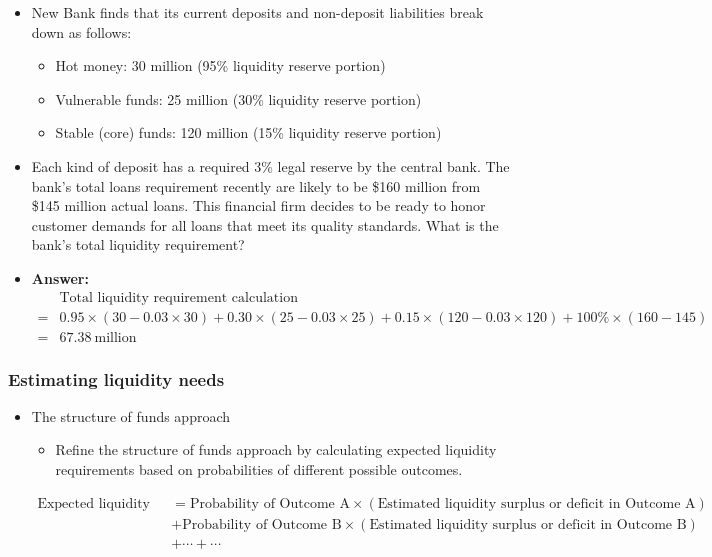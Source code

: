 \begin{itemize}
  \item New Bank finds that its current deposits and non-deposit liabilities break down as follows:
  \begin{itemize}
    \item Hot money: 30 million (95\% liquidity reserve portion)
    \item Vulnerable funds: 25 million (30\% liquidity reserve portion)
    \item Stable (core) funds: 120 million (15\% liquidity reserve portion)
  \end{itemize}
  \item Each kind of deposit has a required 3\% legal reserve by the central bank. The bank's total loans requirement recently are likely to be \$160 million from \$145 million actual loans. This financial firm decides to be ready to honor customer demands for all loans that meet its quality standards. What is the bank's total liquidity requirement?
  \item \textbf{Answer:}
    \[
    \begin{aligned}
        &\text{Total liquidity requirement calculation} \\
        =&
      0.95 \times (30 - 0.03 \times 30)  + 0.30 \times (25 - 0.03 \times 25) + 0.15 \times (120 - 0.03 \times 120) + 100\% \times (160 - 145) \\
      =& 67.38\ \text{million}
    \end{aligned}
    \]

\end{itemize}







\subsubsection{Estimating liquidity needs}
\begin{itemize}

\item The structure of funds approach
    \begin{itemize}

    \item Refine the structure of funds approach by calculating expected liquidity requirements based on probabilities of different possible outcomes.
   
    \end{itemize}
\[
    \begin{aligned}
        \text{Expected liquidity requirement} &= \text{Probability of Outcome A} \times (\text{Estimated liquidity surplus or deficit in Outcome A}) \\
        &+ \text{Probability of Outcome B} \times (\text{Estimated liquidity surplus or deficit in Outcome B}) \\
        &+ \cdots + \cdots
        \end{aligned} \]
\end{itemize}





